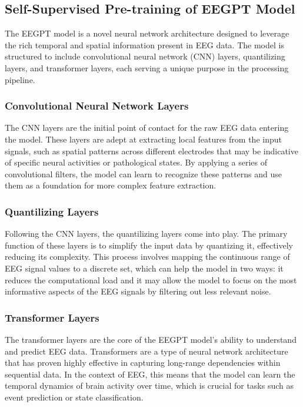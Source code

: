 \documentclass[final,3p,times,twocolumn]{elsarticle}
\begin{document}
\subsection{Self-Supervised Pre-training of EEGPT Model}
The EEGPT model is a novel neural network architecture designed to leverage the rich temporal and spatial information present in EEG data. The model is structured to include convolutional neural network (CNN) layers, quantilizing layers, and transformer layers, each serving a unique purpose in the processing pipeline.

\subsubsection{Convolutional Neural Network Layers}
The CNN layers are the initial point of contact for the raw EEG data entering the model. These layers are adept at extracting local features from the input signals, such as spatial patterns across different electrodes that may be indicative of specific neural activities or pathological states. By applying a series of convolutional filters, the model can learn to recognize these patterns and use them as a foundation for more complex feature extraction.

\subsubsection{Quantilizing Layers}
Following the CNN layers, the quantilizing layers come into play. The primary function of these layers is to simplify the input data by quantizing it, effectively reducing its complexity. This process involves mapping the continuous range of EEG signal values to a discrete set, which can help the model in two ways: it reduces the computational load and it may allow the model to focus on the most informative aspects of the EEG signals by filtering out less relevant noise.

\subsubsection{Transformer Layers}
The transformer layers are the core of the EEGPT model's ability to understand and predict EEG data. Transformers are a type of neural network architecture that has proven highly effective in capturing long-range dependencies within sequential data. In the context of EEG, this means that the model can learn the temporal dynamics of brain activity over time, which is crucial for tasks such as event prediction or state classification.
\end{document}
